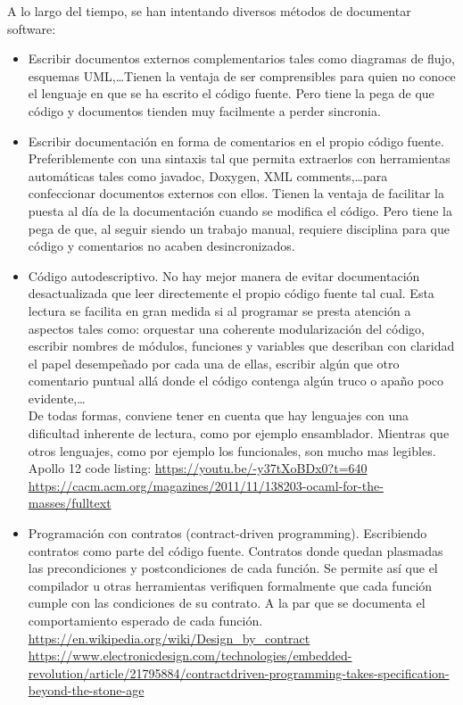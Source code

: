 \documentclass[spanish,12pt,a4paper,final,oneside]{book}
\begin{document}
A lo largo del tiempo, se han intentando diversos métodos de documentar software:
\begin{itemize}

\item Escribir documentos externos complementarios tales como diagramas de flujo, esquemas UML,\ldots Tienen la ventaja de ser comprensibles para quien no conoce el lenguaje en que se ha escrito el código fuente. Pero tiene la pega de que código y documentos tienden muy facilmente a perder sincronia.

\item Escribir documentación en forma de comentarios en el propio código fuente. Preferiblemente con una sintaxis tal que permita extraerlos con herramientas automáticas tales como javadoc, Doxygen, XML comments,\ldots para confeccionar documentos externos con ellos. Tienen la ventaja de facilitar la puesta al día de la documentación cuando se modifica el código. Pero tiene la pega de que, al seguir siendo un trabajo manual, requiere disciplina para que código y comentarios no acaben desincronizados.

\item Código autodescriptivo. No hay mejor manera de evitar documentación desactualizada que leer directemente el propio código fuente tal cual. Esta lectura se facilita en gran medida si al programar se presta atención a aspectos tales como: orquestar una coherente modularización del código, escribir nombres de módulos, funciones y variables que describan con claridad el papel desempeñado por cada una de ellas, escribir algún que otro comentario puntual allá donde el código contenga algún truco o apaño poco evidente,\ldots 
\\De todas formas, conviene tener en cuenta que hay lenguajes con una dificultad inherente de lectura, como por ejemplo ensamblador. Mientras que otros lenguajes, como por ejemplo los funcionales, son mucho mas legibles.
\\ Apollo 12 code listing: \url{https://youtu.be/-y37tXoBDx0?t=640} 
\\ \url{https://cacm.acm.org/magazines/2011/11/138203-ocaml-for-the-masses/fulltext}

\item Programación con contratos (contract-driven programming). Escribiendo contratos como parte del código fuente. Contratos donde quedan plasmadas las precondiciones y postcondiciones de cada función. Se permite así que el compilador u otras herramientas verifiquen formalmente que cada función cumple con las condiciones de su contrato. A la par que se documenta el comportamiento esperado de cada función.
\\ \url{https://en.wikipedia.org/wiki/Design_by_contract}
\\ \url{https://www.electronicdesign.com/technologies/embedded-revolution/article/21795884/contractdriven-programming-takes-specification-beyond-the-stone-age}


\end{itemize}
\end{document}
